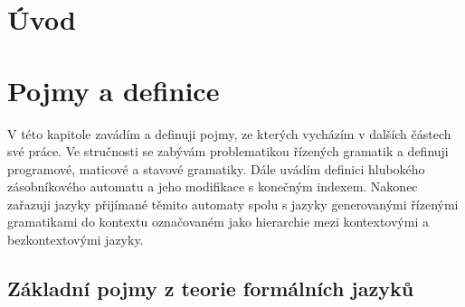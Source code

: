

\chapter{Úvod}








\chapter{Pojmy a definice}

V této kapitole zavádím a definuji pojmy, ze kterých vycházím v dalších částech své práce. Ve stručnosti se zabývám problematikou řízených gramatik a definuji programové, maticové a stavové gramatiky. Dále uvádím definici hlubokého zásobníkového automatu a jeho modifikace s konečným indexem. Nakonec zařazuji jazyky přijímané těmito automaty spolu s jazyky generovanými řízenými gramatikami do kontextu označovaném jako hierarchie mezi kontextovými a bezkontextovými jazyky.

\section{Základní pojmy z teorie formálních jazyků}


